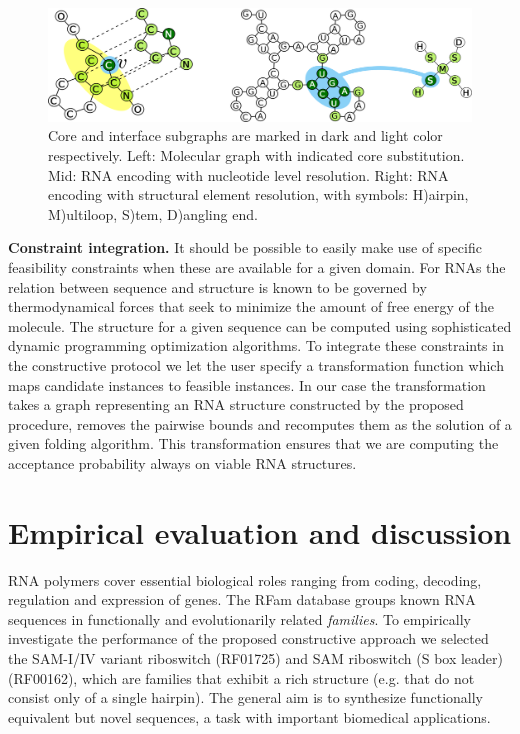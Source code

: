 \documentclass{article}
\begin{document}
\begin{figure}[ht]
      \centering
        \includegraphics[width=0.7\linewidth]{images/allcipsinone.png}
      \caption{
      Core and interface subgraphs are marked in dark and light color
      respectively. Left: Molecular graph with indicated core substitution.
      Mid: RNA encoding with nucleotide level resolution.  Right:  RNA encoding with structural element resolution, with symbols: H)airpin, M)ultiloop, S)tem, D)angling end.}
      \label{allcips}
\end{figure}


\textbf{Constraint integration.} It should be possible to easily make use of
specific feasibility constraints when these are available for a given domain.
For RNAs the relation between sequence and structure is known to be governed
by thermodynamical forces that seek to minimize the amount of free energy of
the molecule. The structure for a given sequence can be computed using
sophisticated dynamic programming optimization algorithms. To integrate these
constraints in the constructive protocol we let the user specify a
transformation function which maps candidate instances to feasible instances.
In our case the transformation takes a graph representing an RNA structure
constructed by the proposed procedure, removes the pairwise bounds and
recomputes them as the solution of a given folding algorithm. This
transformation ensures that we are computing the acceptance probability always
on viable RNA structures.


\section{Empirical evaluation and discussion}

RNA polymers cover essential biological roles ranging from coding, decoding,
regulation and expression of genes. The RFam database \citep{rfam} groups
known RNA sequences in functionally and evolutionarily related {\em families}. To
empirically investigate the performance of the proposed constructive approach
we selected the SAM-I/IV variant riboswitch (RF01725) and SAM riboswitch (S
box leader) (RF00162), which are families that exhibit a rich structure (e.g.
that do not consist only of a single hairpin). The general aim is to
synthesize functionally equivalent but novel sequences, a task with important
biomedical applications.
\end{document}

